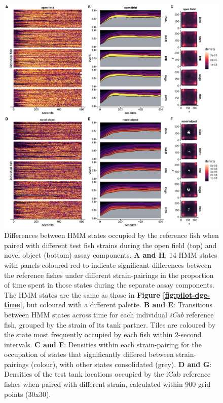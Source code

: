 \documentclass[
]{book}
\begin{document}
\begin{figure}
\includegraphics[width=1\linewidth]{figs/pilot/0.08_14_sge} \caption{Differences between HMM states occupied by the reference fish when paired with different test fish strains during the open field (top) and novel object (bottom) assay components. \textbf{A and H}: 14 HMM states with panels coloured red to indicate significant differences between the reference fishes under different strain-pairings in the proportion of time spent in those states during the separate assay components. The HMM states are the same as those in \textbf{Figure \ref{fig:pilot-dge-time}}, but coloured with a different palette. \textbf{B and E}: Transitions between HMM states across time for each individual \emph{iCab} reference fish, grouped by the strain of its tank partner. Tiles are coloured by the state most frequently occupied by each fish within 2-second intervals. \textbf{C and F}: Densities within each strain-pairing for the occupation of states that significantly differed between strain-pairings (colour), with other states consolidated (grey). \textbf{D and G}: Densities of the test tank locations occupied by the iCab reference fishes when paired with different strain, calculated within 900 grid points (30x30).}\label{fig:pilot-sge-time}
\end{figure}
\end{document}
